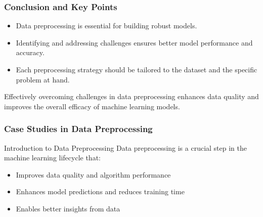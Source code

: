 \documentclass[aspectratio=169]{beamer}
\begin{document}
\begin{frame}[fragile]
    \frametitle{Conclusion and Key Points}
    \begin{itemize}
        \item Data preprocessing is essential for building robust models.
        \item Identifying and addressing challenges ensures better model performance and accuracy.
        \item Each preprocessing strategy should be tailored to the dataset and the specific problem at hand.
    \end{itemize}
    Effectively overcoming challenges in data preprocessing enhances data quality and improves the overall efficacy of machine learning models.
\end{frame}

\begin{frame}[fragile]
    \frametitle{Case Studies in Data Preprocessing}
    \begin{block}{Introduction to Data Preprocessing}
        Data preprocessing is a crucial step in the machine learning lifecycle that:
        \begin{itemize}
            \item Improves data quality and algorithm performance
            \item Enhances model predictions and reduces training time
            \item Enables better insights from data
        \end{itemize}
    \end{block}
\end{frame}
\end{document}

